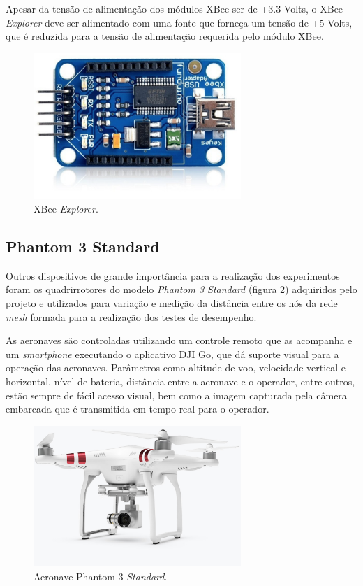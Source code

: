 Apesar da tensão de alimentação dos módulos XBee ser de +3.3 Volts, o XBee \emph{Explorer} deve ser alimentado com uma fonte que forneça um tensão de +5 Volts, que é reduzida para a tensão de alimentação requerida pelo módulo XBee.

\begin{figure}[h!] 
\center
\includegraphics[width=0.7\textwidth]{xbeeexplorer.png}
\caption{XBee \emph{Explorer}.} 
\label{fig:xbeeexplorer}
\end{figure} 

\subsection{Phantom 3 Standard}

Outros dispositivos de grande importância para a realização dos experimentos foram os quadrirrotores do modelo \emph{Phantom 3 Standard} (figura \ref{fig:phantom}) adquiridos pelo projeto e utilizados para variação e medição da distância entre os nós da rede \emph{mesh} formada para a realização dos testes de desempenho.

As aeronaves são controladas utilizando um controle remoto que as acompanha e um \emph{smartphone} executando o aplicativo DJI Go, que dá suporte visual para a operação das aeronaves. Parâmetros como altitude de voo, velocidade vertical e horizontal, nível de bateria, distância entre a aeronave e o operador, entre outros, estão sempre de fácil acesso visual, bem como a imagem capturada pela câmera embarcada que é transmitida em tempo real para o operador. 

\begin{figure}[h!] 
\center
\includegraphics[width=0.7\textwidth]{phatom.jpg}
\caption{Aeronave Phantom 3 \emph{Standard}.} 
\label{fig:phantom}
\end{figure}

